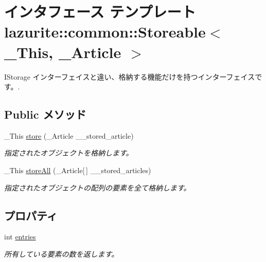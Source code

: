 \hypertarget{interfacelazurite_1_1common_1_1_storeable_3_01___this_00_01___article_01_4}{
\section{インタフェース テンプレート lazurite::common::Storeable$<$ \_\-This, \_\-Article $>$}
\label{interfacelazurite_1_1common_1_1_storeable_3_01___this_00_01___article_01_4}
}


IStorage インターフェイスと違い、格納する機能だけを持つインターフェイスです。.  
\subsection*{Public メソッド}
\begin{DoxyCompactItemize}
\item 
\_\-This \hyperlink{interfacelazurite_1_1common_1_1_storeable_3_01___this_00_01___article_01_4_a4bb23c87a2e80c3427a31f2d82c7b5ae}{store} (\_\-Article \_\-\_\-stored\_\-article)
\begin{DoxyCompactList}\small\item\em 指定されたオブジェクトを格納します。 \item\end{DoxyCompactList}\item 
\_\-This \hyperlink{interfacelazurite_1_1common_1_1_storeable_3_01___this_00_01___article_01_4_a9ea7c4555c82aab2180a21e2e2b745a6}{storeAll} (\_\-Article\mbox{[}$\,$\mbox{]} \_\-\_\-stored\_\-articles)
\begin{DoxyCompactList}\small\item\em 指定されたオブジェクトの配列の要素を全て格納します。 \item\end{DoxyCompactList}\end{DoxyCompactItemize}
\subsection*{プロパティ}
\begin{DoxyCompactItemize}
\item 
int \hyperlink{interfacelazurite_1_1common_1_1_storeable_3_01___this_00_01___article_01_4_a9a09381c72b495870c6920d820f8d816}{entries}
\begin{DoxyCompactList}\small\item\em 所有している要素の数を返します。 \item\end{DoxyCompactList}\end{DoxyCompactItemize}


